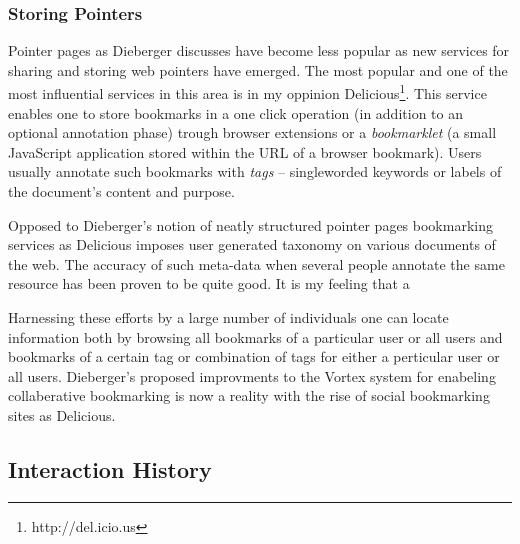 \documentclass[12pt,a4paper]{article}
\begin{document}
\subsubsection{Storing Pointers}

Pointer pages as Dieberger discusses have become less popular as new services
for sharing and storing web pointers have emerged. The most popular and one of
the most influential services in this area is in my oppinion
Delicious\footnote{http://del.icio.us}. This service enables one to store
bookmarks in a one click operation (in addition to an optional annotation
phase) trough browser extensions or a \emph{bookmarklet} (a small JavaScript
application stored within the URL of a browser bookmark). Users usually
annotate such bookmarks with \emph{tags} -- singleworded keywords or labels of
the document's content and purpose.

Opposed to Dieberger's notion of neatly structured pointer pages
bookmarking services as Delicious imposes user generated taxonomy on various
documents of the web. The accuracy of such meta-data when several people
annotate the same resource has been proven to be quite good\cite{golder05}. It
is my feeling that a

Harnessing these efforts by a large number of individuals one can locate
information both by browsing all
bookmarks of a particular user or all users and bookmarks of a certain tag or
combination of tags for either a perticular user or all users.
Dieberger's proposed improvments to the Vortex system for enabeling
collaberative bookmarking is now a reality with the rise of social bookmarking
sites as Delicious.





\subsection{Interaction History}
\end{document}
